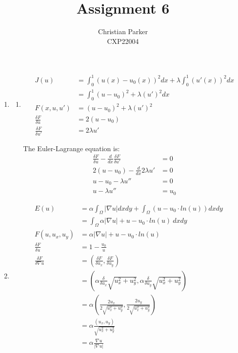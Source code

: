 \documentclass{article}
\title{Assignment 6}
\author{Christian Parker \\ CXP22004}
\begin{document}
\maketitle

\begin{enumerate}
    \item
    \begin{enumerate}
        \item
        \begin{align*}
            J(u) &= \int_{0}^{1} (u(x) - u_0 (x))^2 dx + \lambda \int_{0}^{1} (u'(x))^2 dx \\
            &= \int_{0}^{1} (u - u_0)^2 + \lambda (u')^2 dx \\
            F(x, u, u') &= (u - u_0)^2 + \lambda (u')^2 \\
            \frac{\delta F}{\delta u} &= 2(u - u_0) \\
            \frac{\delta F}{\delta u'} &= 2 \lambda u'
        \end{align*}

        The Euler-Lagrange equation is:
        \begin{align*}
            \frac{\delta F}{\delta u} - \frac{d}{dx} \frac{\delta F}{\delta u'} &= 0 \\
            2(u - u_0) - \frac{d}{dx} 2 \lambda u' &= 0 \\
            u - u_0 - \lambda u'' &= 0 \\
            u - \lambda u'' &= u_0
        \end{align*}
    \end{enumerate}

    \item
    \begin{align*}
        E(u) &= \alpha \int_{\Omega} | \nabla u | dxdy + \int_{\Omega} (u - u_0 \cdot ln(u)) dxdy \\
        &= \int_{\Omega} \alpha | \nabla u | + u - u_0 \cdot ln(u)\ dxdy \\
        F(u, u_x, u_y) &= \alpha | \nabla u | + u - u_0 \cdot ln(u) \\
        \frac{\delta F}{\delta u} &= 1 - \frac{u_0}{u} \\
        \frac{\delta F}{\delta \nabla u} &= \left( \frac{\delta F}{\delta u_x}, \frac{\delta F}{\delta u_y} \right) \\
        &= \left( \alpha \frac{\delta}{\delta u_x} \sqrt{u_x^2 + u_y^2}, \alpha \frac{\delta}{\delta u_y} \sqrt{u_x^2 + u_y^2} \right) \\
        &= \alpha \left( \frac{2 u_x}{2 \sqrt{u_x^2 + u_y^2}}, \frac{2 u_y}{2 \sqrt{u_x^2 + u_y^2}} \right) \\
        &= \alpha \frac{(u_x, u_y)}{\sqrt{u_x^2 + u_y^2}} \\
        &= \alpha \frac{\nabla u}{| \nabla u |}
    \end{align*}


\end{enumerate}
\end{document}
